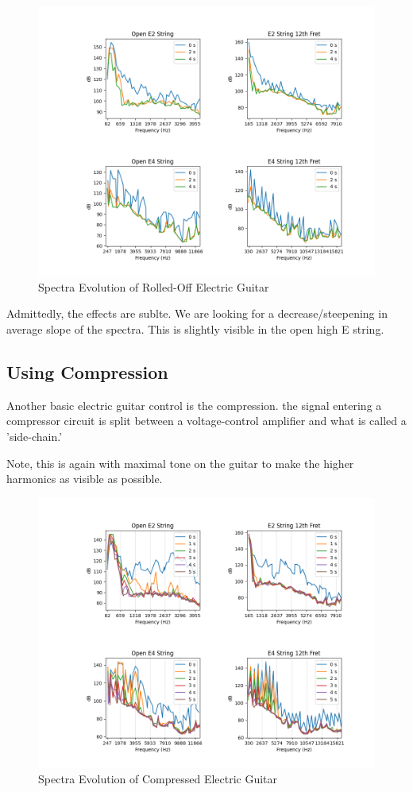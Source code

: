\documentclass[10pt, a4paper]{article}
\begin{document}
\begin{figure}[H]
\centering
\caption{Spectra Evolution of Rolled-Off Electric Guitar}
\includegraphics[scale=0.5]{rolhvt.png}
\end{figure}

Admittedly, the effects are sublte. We are looking for a decrease/steepening in average slope of the spectra. This is slightly visible in the open high E string.

\subsection{Using Compression}
Another basic electric guitar control is the compression.
the signal entering a compressor circuit is split between a voltage-control amplifier and what is called a 'side-chain.'

Note, this is again with maximal tone on the guitar to make the higher harmonics as visible as possible.

\begin{figure}[H]
\centering
\caption{Spectra Evolution of Compressed Electric Guitar}
\includegraphics[scale=0.5]{comphvt.png}
\end{figure}
\end{document}
